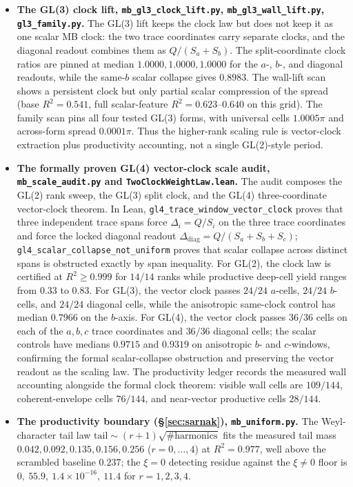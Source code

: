 \documentclass[11pt]{article}
\theoremstyle{definition}
\begin{document}
\begin{itemize}
\item \textbf{The GL(3) clock lift, \texttt{mb\_gl3\_clock\_lift.py},
\texttt{mb\_gl3\_wall\_lift.py}, \texttt{gl3\_family.py}.} The GL(3) lift keeps the clock law but
does not keep it as one scalar MB clock: the two trace coordinates carry separate clocks, and the diagonal
readout combines them as $Q/(S_a+S_b)$. The split-coordinate clock ratios are pinned at median
$1.0000,1.0000,1.0000$ for the $a$-, $b$-, and diagonal readouts, while the same-$b$ scalar collapse gives
$0.8983$. The wall-lift scan shows a persistent clock but only partial scalar compression of the spread
(base $R^2=0.541$, full scalar-feature $R^2=0.623$--$0.640$ on this grid). The family scan pins all four
tested GL(3) forms, with universal cells $1.0005\pi$ and across-form spread $0.0001\pi$. Thus the higher-rank
scaling rule is vector-clock extraction plus productivity accounting, not a single GL(2)-style period.

\item \textbf{The formally proven GL(4) vector-clock scale audit, \texttt{mb\_scale\_audit.py} and
\texttt{TwoClockWeightLaw.lean}.} The audit composes the GL(2) rank sweep, the GL(3) split clock, and the
GL(4) three-coordinate vector-clock theorem. In Lean,
\texttt{gl4\_trace\_window\_vector\_clock} proves that three independent trace spans force
$\Delta_i=Q/S_i$ on the three trace coordinates and force the locked diagonal readout
$\Delta_{\mathrm{diag}}=Q/(S_a+S_b+S_c)$; \texttt{gl4\_scalar\_collapse\_not\_uniform} proves that scalar
collapse across distinct spans is obstructed exactly by span inequality. For GL(2), the clock law is certified
at $R^2\ge0.999$ for $14/14$ ranks while productive deep-cell yield ranges from $0.33$ to $0.83$. For GL(3),
the vector clock passes $24/24$ $a$-cells, $24/24$ $b$-cells, and $24/24$ diagonal cells, while the anisotropic
same-clock control has median $0.7966$ on the $b$-axis. For GL(4), the vector clock passes $36/36$ cells on
each of the $a,b,c$ trace coordinates and $36/36$ diagonal cells; the scalar controls have medians $0.9715$ and
$0.9319$ on anisotropic $b$- and $c$-windows, confirming the formal scalar-collapse obstruction and preserving
the vector readout as the scaling law. The productivity ledger records the measured wall accounting alongside
the formal clock theorem: visible wall cells are $109/144$, coherent-envelope cells $76/144$, and near-vector
productive cells $28/144$.

\item \textbf{The productivity boundary (\S\ref{sec:sarnak}), \texttt{mb\_uniform.py}.} The
Weyl-character tail law $\text{tail}\sim(r{+}1)\sqrt{\#\text{harmonics}}$ fits the measured tail mass
$0.042,0.092,0.135,0.156,0.256$ ($r=0,\dots,4$) at $R^2=0.977$, well above the scrambled baseline
$0.237$; the $\xi=0$ detecting residue against the $\xi\neq0$ floor is
$0,\ 55.9,\ 1.4\times10^{-16},\ 11.4$ for $r=1,2,3,4$.


\end{itemize}
\end{document}
